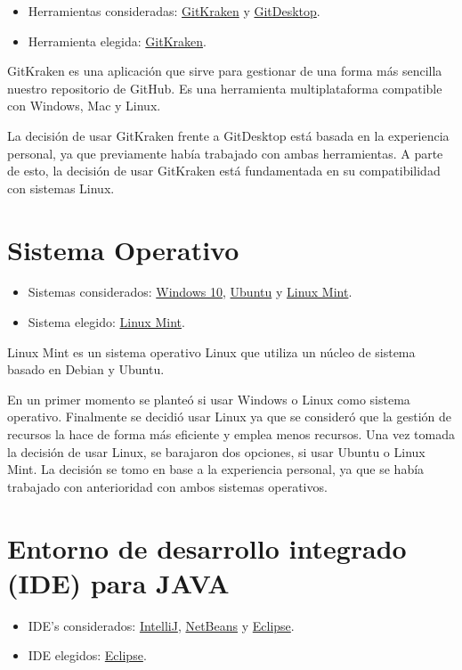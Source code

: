 \begin{itemize}
	\tightlist
	\item
	Herramientas consideradas: \href{https://www.gitkraken.com/}{GitKraken} y \href{https://desktop.github.com/}{GitDesktop}.
	\item
	Herramienta elegida: \href{https://www.gitkraken.com/}{GitKraken}.
\end{itemize}

GitKraken es una aplicación que sirve para gestionar de una forma más sencilla nuestro repositorio de GitHub. Es una herramienta multiplataforma compatible con Windows, Mac y Linux.

La decisión de usar GitKraken frente a GitDesktop está basada en la experiencia personal, ya que previamente había trabajado con ambas herramientas. A parte de esto, la decisión de usar GitKraken está fundamentada en su compatibilidad con sistemas Linux.

\section{Sistema Operativo}

\begin{itemize}
	\tightlist
	\item
	Sistemas considerados: \href{https://www.microsoft.com/es-es/windows}{Windows 10}, \href{https://www.ubuntu.com/}{Ubuntu} y \href{https://linuxmint.com/}{Linux Mint}.
	\item
	Sistema elegido: \href{https://linuxmint.com/}{Linux Mint}.
\end{itemize}

Linux Mint es un sistema operativo Linux que utiliza un núcleo de sistema basado en Debian y Ubuntu.

En un primer momento se planteó si usar Windows o Linux como sistema operativo. Finalmente se decidió usar Linux ya que se consideró que la gestión de recursos la hace de forma más eficiente y emplea menos recursos. Una vez tomada la decisión de usar Linux, se barajaron dos opciones, si usar Ubuntu o Linux Mint. La decisión se tomo en base a la experiencia personal, ya que se había trabajado con anterioridad con ambos sistemas operativos.

\section{Entorno de desarrollo integrado (IDE) para JAVA}

\begin{itemize}
	\tightlist
	\item
	IDE's considerados: \href{https://www.jetbrains.com/idea/}{IntelliJ}, \href{https://netbeans.org/}{NetBeans} y \href{https://eclipse.org/}{Eclipse}.
	\item
	IDE elegidos: \href{https://eclipse.org/}{Eclipse}.
\end{itemize}

